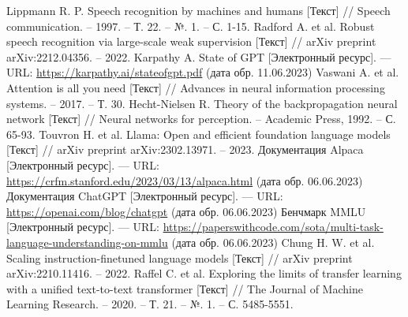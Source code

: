 \begin{thebibliography}{99}
  Lippmann R. P. Speech recognition by machines and humans [Текст] // Speech communication. – 1997. – Т. 22. – №. 1. – С. 1-15.
  Radford A. et al. Robust speech recognition via large-scale weak supervision [Текст] // arXiv preprint arXiv:2212.04356. – 2022.
  Karpathy A. State of GPT [Электронный ресурс]. --- URL: \url{https://karpathy.ai/stateofgpt.pdf} (дата обр. 11.06.2023)
  Vaswani A. et al. Attention is all you need [Текст] // Advances in neural information processing systems. – 2017. – Т. 30.
  Hecht-Nielsen R. Theory of the backpropagation neural network [Текст] // Neural networks for perception. – Academic Press, 1992. – С. 65-93.
  Touvron H. et al. Llama: Open and efficient foundation language models [Текст] // arXiv preprint arXiv:2302.13971. – 2023.
  Документация Alpaca [Электронный ресурс]. --- URL: \url{https://crfm.stanford.edu/2023/03/13/alpaca.html} (дата обр. 06.06.2023)
  Документация ChatGPT [Электронный ресурс]. --- URL: \url{https://openai.com/blog/chatgpt} (дата обр. 06.06.2023)
  Бенчмарк MMLU [Электронный ресурс]. --- URL: \url{https://paperswithcode.com/sota/multi-task-language-understanding-on-mmlu} (дата обр. 06.06.2023)
  Chung H. W. et al. Scaling instruction-finetuned language models [Текст] // arXiv preprint arXiv:2210.11416. – 2022.
  Raffel C. et al. Exploring the limits of transfer learning with a unified text-to-text transformer [Текст] // The Journal of Machine Learning Research. – 2020. – Т. 21. – №. 1. – С. 5485-5551.
\end{thebibliography}